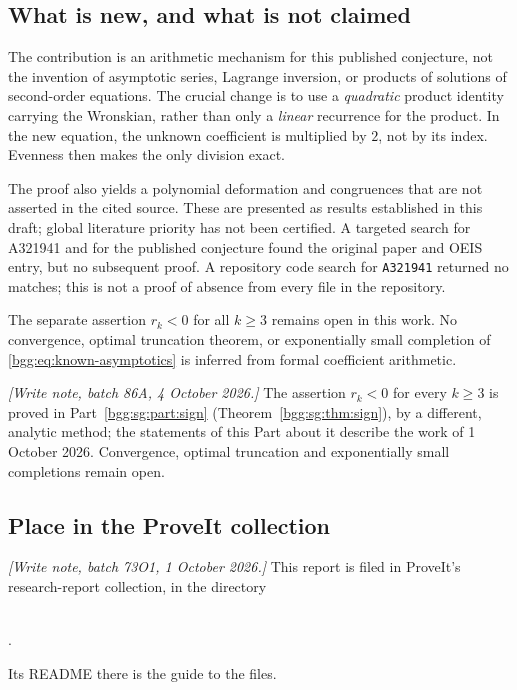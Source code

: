 \documentclass[11pt,a4paper]{article}
\numberwithin{equation}{section}
\theoremstyle{definition}
\theoremstyle{remark}
\theoremstyle{definition}
\begin{document}
\subsection{What is new, and what is not claimed}

The contribution is an arithmetic mechanism for this published conjecture,
not the invention of asymptotic series, Lagrange inversion, or products of
solutions of second-order equations. The crucial change is to use a
\emph{quadratic} product identity carrying the Wronskian, rather than only a
\emph{linear} recurrence for the product. In the new equation, the unknown
coefficient is multiplied by $2$, not by its index. Evenness then makes the
only division exact.

The proof also yields a polynomial deformation and congruences that are not
asserted in the cited source. These are presented as results established in
this draft; global literature priority has not been certified. A targeted
search for A321941 and for the published conjecture found the original paper
and OEIS entry, but no subsequent proof. A repository code search for
\texttt{A321941} returned no matches; this is not a proof of absence from every
file in the repository.

The separate assertion $r_k<0$ for all $k\ge3$ remains open in this work.
No convergence, optimal truncation theorem, or exponentially small completion
of \eqref{bgg:eq:known-asymptotics} is inferred from formal coefficient arithmetic.

\emph{[Write note, batch 86A, 4 October 2026.]} The assertion $r_k<0$ for
every $k\ge3$ is proved in Part~\ref{bgg:sg:part:sign}
(Theorem~\ref{bgg:sg:thm:sign}), by a different, analytic method; the
statements of this Part about it describe the work of 1 October 2026.
Convergence, optimal truncation and exponentially small completions
remain open.

\subsection{Place in the ProveIt collection}
\label{bgg:sec:collection}

\emph{[Write note, batch 73O1, 1 October 2026.]} This report is filed in
ProveIt's research-report collection, in the directory
\begin{center}\small
{}\\
.
\end{center}
Its README there is the guide to the files.
\end{document}
